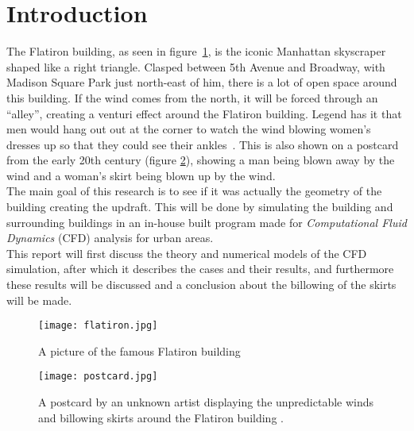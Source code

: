 \section{Introduction}
\label{intro}
The Flatiron building, as seen in figure~\ref{fig:flatiron}, is the iconic Manhattan skyscraper shaped like a right triangle. Clasped between 5th Avenue and Broadway, with Madison Square Park just north-east of him, there is a lot of open space around this building. If the wind comes from the north, it will be forced through an ``alley'', creating a venturi effect around the Flatiron building. Legend has it that men would hang out out at the corner to watch the wind blowing women's dresses up so that they could see their ankles~\cite{dresses}. This is also shown on a postcard from the early 20th century (figure \ref{fig:postalcard}), showing a man being blown away by the wind and a woman's skirt being blown up by the wind.  \\
\indent The main goal of this research is to see if it was actually the geometry of the building creating the updraft. This will be done by simulating the building and surrounding buildings in an in-house built program made for \emph{Computational Fluid Dynamics} (CFD) analysis for urban areas. \\
\indent This report will first discuss the theory and numerical models of the CFD simulation, after which it describes the cases and their results, and furthermore these results will be discussed and a conclusion about the billowing of the skirts will be made.
\begin{figure}[h!]
\centering
\texttt{[image: flatiron.jpg]}
\caption{A picture of the famous Flatiron building}
\label{fig:flatiron}
\end{figure}
\begin{figure}[h!]
\centering
\texttt{[image: postcard.jpg]}
\caption{A postcard by an unknown artist displaying the unpredictable winds and billowing skirts around the Flatiron building \cite{postalcard}.}
\label{fig:postalcard}
\end{figure}
